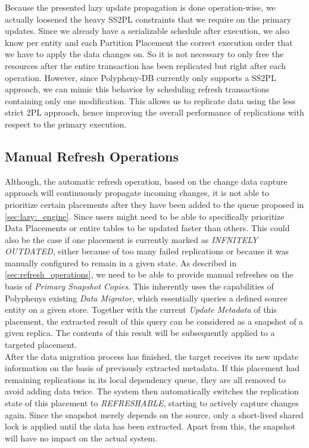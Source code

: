 Because the presented lazy update propagation is done operation-wise, we actually loosened the heavy SS2PL constraints that we require on the primary updates. 
Since we already have a serializable schedule after execution, we also know per entity and each Partition Placement 
the correct execution order that we have to apply the data changes on. So it is not necessary to only free the resources 
after the entire transaction has been replicated but right after each operation. 
However, since Polypheny-DB currently only supports a SS2PL approach, we can 
mimic this behavior by scheduling refresh transactions containing only one modification.
This allows us to replicate data using the less strict 2PL approach, hence improving the overall performance of replications with respect to the primary execution.



\subsection{Manual Refresh Operations}
\label{sec:manual_refresh}

Although, the automatic refresh operation, based on the change data capture approach will continuously propagate incoming changes,
it is not able to prioritize certain placements after they have been added to the queue proposed in \ref{sec:lazy:_engine}.
Since users might need to be able to specifically prioritize Data Placements or entire tables to be updated faster than others. 
This could also be the case if one placement is currently marked as \emph{INFNITELY OUTDATED},
either because of too many failed replications or because it was manually configured to remain in a given state. 
As described in \ref{sec:refresh_operations}, we need to be able to provide manual refreshes on the basis of \emph{Primary Snapshot Copies}.
This inherently uses the capabilities of Polyphenys existing \emph{Data Migrator}, which essentially queries a defined source entity on a given store. 
Together with the current \emph{Update Metadata} of this placement, the extracted result of this query can be considered as a snapshot of a given replica.
The contents of this result will be subsequently applied to a targeted placement.\\
After the data migration process has finished, the target receives its new update information on the basis of previously extracted metadata.
If this placement had remaining replications in its local dependency queue, they are all removed to avoid adding data twice. 
The system then automatically switches the replication state of this placement to \emph{REFRESHABLE}, starting to actively capture changes again.
Since the snapshot merely depends on the source, only a short-lived shared lock is applied until the data has been extracted. Apart from this, the snapshot will have no impact
on the actual system.


